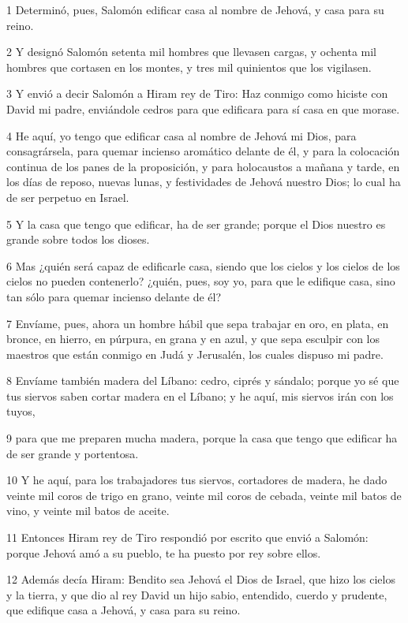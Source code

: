 \par 1 Determinó, pues, Salomón edificar casa al nombre de Jehová, y casa para su reino.
\par 2 Y designó Salomón setenta mil hombres que llevasen cargas, y ochenta mil hombres que cortasen en los montes, y tres mil quinientos que los vigilasen.
\par 3 Y envió a decir Salomón a Hiram rey de Tiro: Haz conmigo como hiciste con David mi padre, enviándole cedros para que edificara para sí casa en que morase.
\par 4 He aquí, yo tengo que edificar casa al nombre de Jehová mi Dios, para consagrársela, para quemar incienso aromático delante de él, y para la colocación continua de los panes de la proposición, y para holocaustos a mañana y tarde, en los días de reposo, nuevas lunas, y festividades de Jehová nuestro Dios; lo cual ha de ser perpetuo en Israel.
\par 5 Y la casa que tengo que edificar, ha de ser grande; porque el Dios nuestro es grande sobre todos los dioses.
\par 6 Mas ¿quién será capaz de edificarle casa, siendo que los cielos y los cielos de  los cielos no pueden contenerlo? ¿quién, pues, soy yo, para que le edifique casa, sino tan sólo para quemar incienso delante de él?
\par 7 Envíame, pues, ahora un hombre hábil que sepa trabajar en oro, en plata, en bronce, en hierro, en púrpura, en grana y en azul, y que sepa esculpir con los maestros que están conmigo en Judá y Jerusalén, los cuales dispuso mi padre.
\par 8 Envíame también madera del Líbano: cedro, ciprés y sándalo; porque yo sé que tus siervos saben cortar madera en el Líbano; y he aquí, mis siervos irán con los tuyos,
\par 9 para que me preparen mucha madera, porque la casa que tengo que edificar ha de ser grande y portentosa.
\par 10 Y he aquí, para los trabajadores tus siervos, cortadores de madera, he dado veinte mil coros   de trigo en grano, veinte mil coros de cebada, veinte mil batos de vino, y veinte mil batos de aceite.
\par 11 Entonces Hiram rey de Tiro respondió por escrito que envió a Salomón: porque Jehová amó a su pueblo, te ha puesto por rey sobre ellos.
\par 12 Además decía Hiram: Bendito sea Jehová el Dios de Israel, que hizo los cielos y la tierra, y que dio al rey David un hijo sabio, entendido, cuerdo y prudente, que edifique casa a Jehová, y casa para su reino.

